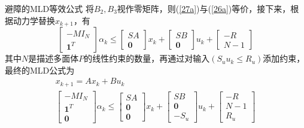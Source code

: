 \documentclass[notheorems,11pt]{beamer}
\theoremstyle{plain}
\numberwithin{theorem}{section}
\numberwithin{lemma}{section}
\numberwithin{corollary}{section}
\theoremstyle{example}
\begin{document}
\begin{frame}{避障的MLD等效公式}
  将$B_2,B_3$视作零矩阵，则(\ref{27a})与(\ref{26a})等价，接下来，根据动力学替换$x_{k+1}$，有
  \begin{equation}
    \left[\begin{gathered}
      -MI_N \\
      \mathbf{1}^T
    \end{gathered}\right]\alpha_k\leqslant \left[\begin{gathered}
      SA \\
      \mathbf{0}
    \end{gathered}\right]x_k+\left[\begin{gathered}
      SB \\
      \mathbf{0}
    \end{gathered}\right]u_k+\left[\begin{gathered}
      -R \\
      N-1
    \end{gathered}\right] 
  \end{equation}
  其中$N$是描述多面体$P$的线性约束的数量，再通过对输入$(S_uu_k\leqslant R_u)$添加约束，最终的MLD公式为
  \begin{subequations}
  \begin{gather}
    x_{k+1}=Ax_k+Bu_k \label{29a}\\
    \left[\begin{gathered}
      -MI_N \\
      \mathbf{1}^T \\
      \mathbf{0}
    \end{gathered}\right]\alpha_k\leqslant \left[\begin{gathered}
      SA \\
      \mathbf{0} \\
      \mathbf{0}
    \end{gathered}\right]x_k+\left[\begin{gathered}
      SB \\
      \mathbf{0} \\
      -S_u
    \end{gathered}\right]u_k+\left[\begin{gathered}
      -R \\
      N-1 \\
      R_u
    \end{gathered}\right]
  \end{gather}
  \end{subequations}
\end{frame}
\end{document}
